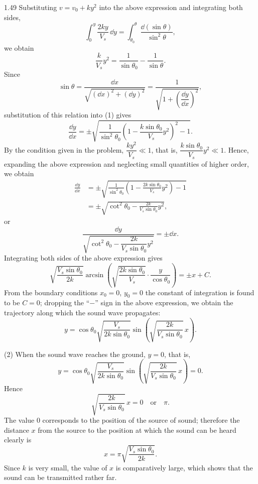\begin{solution}{1.49}
Substituting $v=v_0+ky^2$ into the above expression and integrating both sides,
\[
\int_0^y\frac{2ky}{V_s}\,\dd y=\int_{\theta_0}^{\theta}\frac{\dd\left(\sin\theta\right)}{\sin^2\theta},
\]
we obtain
\begin{equation}
\frac{k}{V_s}y^2=\frac{1}{\sin\theta_0}-\frac{1}{\sin\theta}. \tag{1}
\end{equation}
Since
\[
\sin\theta=\frac{\dd x}{\sqrt{(\dd x)^2+(\dd y)^2}}=\frac{1}{\sqrt{1+\left(\dfrac{\dd y}{\dd x}\right)^2}},
\]
substitution of this relation into (1) gives
\[
\frac{\dd y}{\dd x}=\pm\sqrt{\frac{1}{\sin^2\theta_0}\left(1-\frac{k\sin\theta_0}{V_s}y^2\right)^2-1}.
\]
By the condition given in the problem, $\dfrac{ky^2}{V_s}\ll1$, that is, $\dfrac{k\sin\theta_0}{V_s}y^2\ll1$. Hence, expanding the above expression and neglecting small quantities of higher order, we obtain
\[
\begin{aligned}
\frac{\dd y}{\dd x}&=\pm\sqrt{\frac{1}{\sin^2\theta_0}\left(1-\frac{2k\sin\theta_0}{V_s}y^2\right)-1}\\
&=\pm\sqrt{\cot^2\theta_0-\frac{2k}{V_s\sin\theta_0}y^2},
\end{aligned}
\]
or
\[
\frac{\dd y}{\sqrt{\cot^2\theta_0-\dfrac{2k}{V_s\sin\theta_0}y^2}}=\pm\dd x.
\]
Integrating both sides of the above expression gives
\[
\sqrt{\frac{V_s\sin\theta_0}{2k}}\arcsin\left(\sqrt{\frac{2k\sin\theta_0}{V_s}}\cdot\frac{y}{\cos\theta_0}\right)=\pm x+C.
\]
From the boundary conditions $x_0=0$, $y_0=0$ the constant of integration is found to be $C=0$; dropping the ``$-$'' sign in the above expression, we obtain the trajectory along which the sound wave propagates:
\begin{equation}
y=\cos\theta_0\sqrt{\frac{V_s}{2k\sin\theta_0}}\sin\left(\sqrt{\frac{2k}{V_s\sin\theta_0}}\,x\right). \tag{2}
\end{equation}

(2) When the sound wave reaches the ground, $y=0$, that is,
\[
y=\cos\theta_0\sqrt{\frac{V_s}{2k\sin\theta_0}}\sin\left(\sqrt{\frac{2k}{V_s\sin\theta_0}}\,x\right)=0.
\]
Hence
\[
\sqrt{\frac{2k}{V_s\sin\theta_0}}\,x=0\quad\text{or}\quad\pi.
\]
The value $0$ corresponds to the position of the source of sound; therefore the distance $x$ from the source to the position at which the sound can be heard clearly is
\[
x=\pi\sqrt{\frac{V_s\sin\theta_0}{2k}}.
\]
Since $k$ is very small, the value of $x$ is comparatively large, which shows that the sound can be transmitted rather far.
\end{solution}


